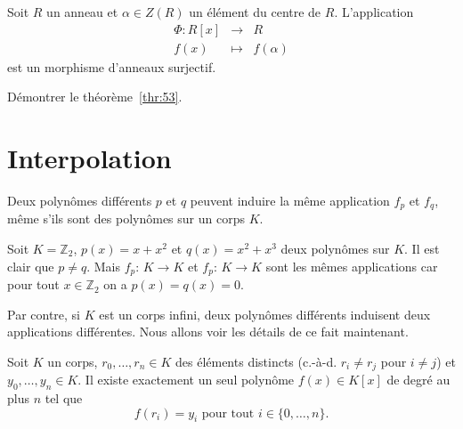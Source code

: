 \begin{theorem}
  \label{thr:53}
  Soit $R$ un anneau et $\alpha \in Z(R)$ un élément du centre de $R$. L'application 
  \begin{displaymath}   
    \begin{array}{rcl}
    \Phi \colon R[x] &\rightarrow & R \\
           f(x) &\mapsto &f(\alpha)          
    \end{array}
  \end{displaymath}
est un morphisme d'anneaux surjectif. 
\end{theorem}


\begin{exercise}
  \label{exe:44}
  Démontrer le théorème~\ref{thr:53}. 
\end{exercise}


\section{Interpolation}
\label{sec:interpolation}


Deux polynômes différents $p$ et $q$ peuvent induire la même application $f_p$ et $f_q$, même s'ils sont des polynômes sur un corps $K$.

\begin{example}
  \label{exe:36}
  Soit $K = ℤ_2$, $p(x) = x + x^2 $ et $q(x) = x^2 + x^3$ deux
  polynômes sur $K$. Il est clair que $p ≠ q$. Mais $f_p:\, K →K$ et
  $f_p:\, K →K$ sont les mêmes applications car pour tout
  $x ∈ℤ_2$ on a $p(x) = q(x) = 0$.
\end{example}

Par contre, si $K$ est un corps infini, deux polynômes différents induisent deux applications différentes. Nous allons voir les détails de ce fait maintenant.

\begin{theorem}
  \label{thr:52}
  Soit $K$ un corps, $r_0,\dots,r_n ∈K$ des éléments distincts (c.-à-d. $r_i ≠ r_j$ pour $i≠j$) et $y_0,\dots,y_n ∈K$. Il existe  exactement un seul polynôme $f(x) ∈ K[x]$ de degré au plus $n$ tel que
  \begin{displaymath}
    f(r_i) = y_i \text{ pour tout } i ∈ \{0,\dots,n\}. 
  \end{displaymath}
\end{theorem}

